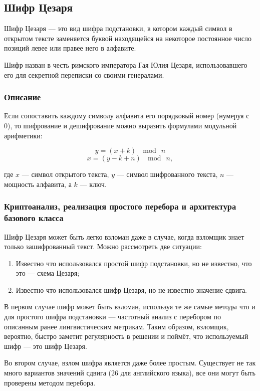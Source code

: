 \subsection{Шифр Цезаря}

Шифр Цезаря — это вид шифра подстановки, в котором каждый символ 
в открытом тексте заменяется буквой находящейся на некоторое 
постоянное число позиций левее или правее него в алфавите.

Шифр назван в честь римского императора Гая Юлия Цезаря, использовавшего 
его для секретной переписки со своими генералами.

\subsubsection{Описание}

Если сопоставить каждому символу алфавита его порядковый номер 
(нумеруя с 0), то шифрование и дешифрование можно выразить формулами 
модульной арифметики:

    $$y=(x+k)\ \mod\ n$$
    $$x=(y-k+n)\ \mod\ n,$$

где $x$ — символ открытого текста, $y$ — символ шифрованного 
текста, $n$ — мощность алфавита, а $k$ — ключ.

\subsubsection{Криптоанализ, реализация простого перебора и архитектура базового класса}

Шифр Цезаря может быть легко взломан даже в случае, когда взломщик 
знает только зашифрованный текст. Можно рассмотреть две ситуации:

\begin{enumerate}
\item Известно что использовался простой шифр подстановки, но 
    не известно, что это — схема Цезаря;
\item Известно что использовался шифр Цезаря, но не известно 
   значение сдвига.
\end{enumerate}

В первом случае шифр может быть взломан, используя те же самые 
методы что и для простого шифра подстановки — частотный 
анализ с перебором по описанным ранее лингвистическим метрикам.
Таким образом, взломщик, вероятно, быстро 
заметит регулярность в решении и поймёт, что используемый шифр — 
это шифр Цезаря.

Во втором случае, взлом шифра является даже более простым. Существует 
не так много вариантов значений сдвига (26 для английского языка), 
все они могут быть проверены методом перебора.

